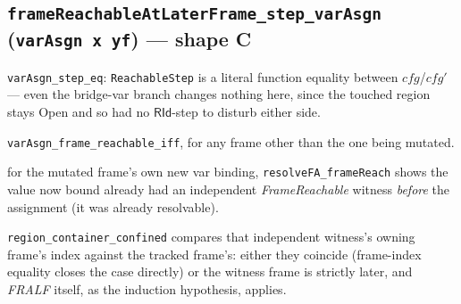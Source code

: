 \documentclass[11pt]{article}
\newcommand{\op}[1]{\texttt{#1}}
\newcommand{\thm}[1]{\textbf{\texttt{#1}}}
\begin{document}
\subsection{\thm{frameReachableAtLaterFrame\_step\_varAsgn} (\op{varAsgn x yf}) --- shape C}
\begin{description}[nosep]
  \item[Step relation, unconditionally] \texttt{varAsgn\_step\_eq}: \texttt{ReachableStep} is a
    literal function equality between $cfg$/$cfg'$ --- even the bridge-var branch changes nothing
    here, since the touched region stays Open and so had no $\mathsf{RId}$-step to disturb either
    side.
  \item[Untouched frames] \texttt{varAsgn\_frame\_reachable\_iff}, for any frame other than the one
    being mutated.
  \item[The new root] for the mutated frame's own new var binding, \texttt{resolveFA\_frameReach}
    shows the value now bound already had an independent \textit{FrameReachable} witness
    \emph{before} the assignment (it was already resolvable).
  \item[Bounding that witness] \texttt{region\_container\_confined} compares that independent
    witness's owning frame's index against the tracked frame's: either they coincide (frame-index
    equality closes the case directly) or the witness frame is strictly later, and \textit{FRALF}
    itself, as the induction hypothesis, applies.
\end{description}
\end{document}
